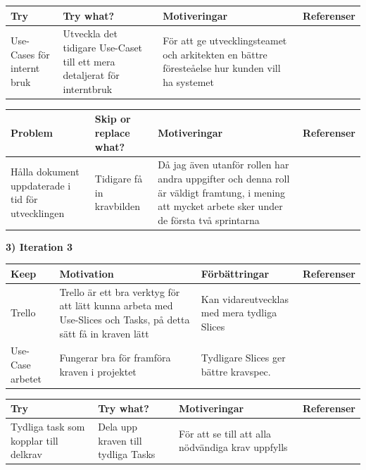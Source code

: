 \documentclass[conference,a4paper]{IEEEtran}
\newcommand\Tstrut{\rule{0pt}{2.6ex}}       %
\newcommand\Bstrut{\rule[-0.9ex]{0pt}{0pt}} %
\newcommand{\TBstrut}{\Tstrut\Bstrut} %
\begin{document}
\begin{table}[H]
	\small
  \centering
	\begin{tabular}{|p{1.5cm}|p{2cm}|p{1.8cm}|p{1.5cm}|} %
    \hline
    Try & Try what? & Motiveringar & Referenser \TBstrut \\
    \hline
    Use-Cases för internt bruk & Utveckla det tidigare Use-Caset till ett mera detaljerat för interntbruk & För att ge utvecklingsteamet och arkitekten en bättre föresteåelse hur kunden vill ha systemet & \TBstrut \\
    \hline
  \end{tabular}
\end{table}

\begin{table}[H]
	\small
  \centering
	\begin{tabular}{|p{1.5cm}|p{2cm}|p{1.8cm}|p{1.5cm}|} %
    \hline
    Problem & Skip or replace what? & Motiveringar & Referenser \TBstrut \\
    \hline
    Hålla dokument uppdaterade i tid för utvecklingen & Tidigare få in kravbilden & Då jag även utanför rollen har andra uppgifter och denna roll är väldigt framtung, i mening att mycket arbete sker under de första två sprintarna  &  \TBstrut \\
    \hline

  \end{tabular}
\end{table}

\textbf{3) Iteration 3}

\begin{table}[H]
	\small
  \centering
	\begin{tabular}{|p{1.5cm}|p{2cm}|p{1.8cm}|p{1.5cm}|} %
    \hline
    Keep & Motivation & Förbättringar & Referenser \TBstrut \\
    \hline
     Trello & Trello är ett bra verktyg för att lätt kunna arbeta med Use-Slices och Tasks, på detta sätt få in kraven lätt & Kan vidareutvecklas med mera tydliga Slices & \cite{Jacobson11} \TBstrut \\
    \hline
    Use-Case arbetet & Fungerar bra för framföra kraven i projektet & Tydligare Slices ger bättre kravspec. &\cite{Jacobson11} \TBstrut \\
    \hline
  \end{tabular}
\end{table}

\begin{table}[H]
	\small
  \centering
	\begin{tabular}{|p{1.5cm}|p{2cm}|p{1.8cm}|p{1.5cm}|} %
    \hline
    Try & Try what? & Motiveringar & Referenser \TBstrut \\
    \hline
     Tydliga task som kopplar till delkrav & Dela upp kraven till tydliga Tasks & För att se till att alla nödvändiga krav uppfylls & \TBstrut \\
    \hline
  \end{tabular}
\end{table}
\end{document}
